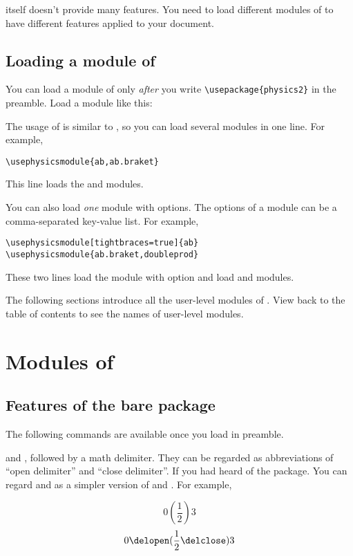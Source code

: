 \documentclass[11pt,letterpaper]{article}
\begin{document}
 itself doesn't provide many features. 
You need to load different modules of  to have different
features applied to your document.

\subsection{Loading a module of }
You can load a module of  only \emph{after} you write
\verb|\usepackage{physics2}| in the preamble. Load a  module
like this:
\begin{center}
\end{center}
The usage of  is similar to , so you can
load several modules in one line. For example,
\begin{Verbatim}
\usephysicsmodule{ab,ab.braket}
\end{Verbatim}
This line loads the  and  modules.

You can also load \emph{one} module with options. The options of a
 module can be a comma-separated key-value list. For example,
\begin{Verbatim}
\usephysicsmodule[tightbraces=true]{ab}
\usephysicsmodule{ab.braket,doubleprod}
\end{Verbatim}
These two lines load the  module with option
 and load  and 
modules.

The following sections introduce all the user-level modules of .
View back to the table of contents to see the names of user-level modules.

\section{Modules of }
\subsection{Features of the bare  package}
The following commands are available once you load  in preamble.

 and , followed by a math delimiter. They can be
regarded as abbreviations of ``open delimiter'' and ``close delimiter''. If
you had heard of the  package. You can regard 
and  as a simpler version of  and .
For example,
\begin{example}
\[    0 \left(\frac12\right) 3    \]
\[ 0 \delopen(\frac12\delclose) 3 \]
\end{example}
\end{document}
